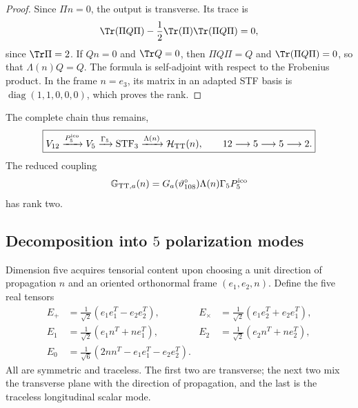 \begin{proof}
Since \(\Pi n=0\), the output is transverse. Its trace is
\[
\Tr(\Pi Q\Pi)-\frac12\Tr(\Pi)\Tr(\Pi Q\Pi)=0,
\]
since \(\Tr\Pi=2\). If \(Qn=0\) and \(\Tr Q=0\), then
\(\Pi Q\Pi=Q\) and \(\Tr(\Pi Q\Pi)=0\), so that
\(\Lambda(n)Q=Q\). The formula is self-adjoint with respect to the
Frobenius product. In the frame \(n=e_3\), its matrix in an adapted STF basis is
\(\operatorname{diag}(1,1,0,0,0)\), which proves the rank.
\end{proof}

The complete chain thus remains,
\begin{equation}
\label{ii:ii:pent:eq:gravity-12-5-5-2}
\boxed{
V_{12}\xrightarrow{P^{\mathrm{ico}}_5}V_5
\xrightarrow{\Gamma_5}\operatorname{STF}_3
\xrightarrow{\Lambda(n)}\mathcal H_{\rm TT}(n),
\qquad 12\longrightarrow5\longrightarrow5\longrightarrow2.}
\end{equation}
The reduced coupling
\begin{equation}
\label{ii:ii:pent:eq:gravity-effective-map}
\mathbb G_{{\rm TT},a}(n)
=G_a(\vartheta^\circ_{108})\Lambda(n)\Gamma_5P^{\mathrm{ico}}_5
\end{equation}
has rank two.

\subsection{Decomposition into \(5\) polarization modes}

Dimension five acquires tensorial content upon choosing a unit direction
of propagation \(n\) and an oriented orthonormal frame
\((e_1,e_2,n)\). Define the five real tensors
\begin{align}
E_{+}&=\frac1{\sqrt2}(e_1e_1^T-e_2e_2^T),
&E_{\times}&=\frac1{\sqrt2}(e_1e_2^T+e_2e_1^T),
\label{ii:ii:pent:eq:gravity-helicity2-real}\\
E_{1}&=\frac1{\sqrt2}(e_1n^T+ne_1^T),
&E_{2}&=\frac1{\sqrt2}(e_2n^T+ne_2^T),
\label{ii:ii:pent:eq:gravity-helicity1-real}\\
E_{0}&=\frac1{\sqrt6}(2nn^T-e_1e_1^T-e_2e_2^T).
\label{ii:ii:pent:eq:gravity-helicity0-real}
\end{align}
All are symmetric and traceless. The first two are transverse; the
next two mix the transverse plane with the direction of
propagation, and the last is the traceless longitudinal scalar mode.

